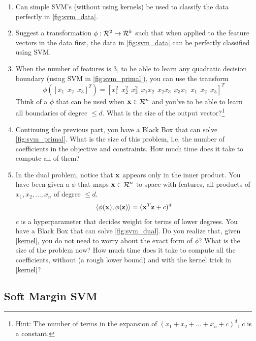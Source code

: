\begin{enumerate}[label=\alph*)]
\item Can simple SVM's (without using kernels) be used to classify the data perfectly in \autoref{fig:svm_data}.
\item Suggest a transformation $\phi: \mathcal{R}^2 \to \mathcal{R}^k$ such that when applied to the feature vectors in the data first, the data in \autoref{fig:svm_data} can be perfectly classified using SVM.

\item When the number of features is $3$, to be able to learn any quadratic decision boundary (using SVM in \autoref{fig:svm_primal}), you can use the transform 
\begin{equation*}
\phi([x_1 \ \ x_2 \ \ x_3]^T) = [x_1^2 \ \ x_2^2 \ \ x_3^2 \ \ x_1x_2 \ \ x_2x_3 \ \ x_3x_1 \ \ x_1 \ \ x_2 \ \ x_3]^T\end{equation*}
Think of a $\phi$ that can be used when $\mathbf{x} \in \mathcal{R}^n$ and you've to be able to learn all boundaries of degree $\leq d$. What is the size of the output vector?\footnote{Hint: The number of terms in the expansion of $(x_1 + x_2 + \dots + x_n + c)^d$, $c$ is a constant.}

\item Continuing the previous part, you have a Black Box that can solve \autoref{fig:svm_primal}. What is the size of this problem, i.e. the number of coefficients in the objective and constraints. How much time does it take to compute all of them?

\item In the dual problem, notice that $\mathbf{x}$ appears only in the inner product. You have been given a $\phi$ that maps $\mathbf{x} \in \mathcal{R}^n$ to space with features, all products of ${x_1, x_2, \dots, x_n}$ of degree $\leq d$.
\begin{equation}\label{kernel}
\langle\phi(\mathbf{x}), \phi(\mathbf{z})\rangle = (\mathbf{x}^T\mathbf{z} + c)^d
\end{equation}
$c$ is a hyperparameter that decides weight for terms of lower degrees. You have a Black Box that can solve \autoref{fig:svm_dual}. Do you realize that, given \autoref{kernel}, you do not need to worry about the exact form of $\phi$? What is the size of the problem now? How much time does it take to compute all the coefficients, without (a rough lower bound) and with the kernel trick in \autoref{kernel}?
\end{enumerate}



\subsection{Soft Margin SVM}

